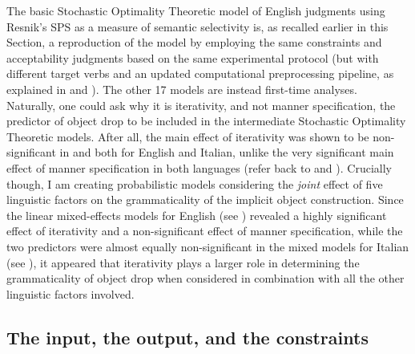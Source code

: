 The basic Stochastic Optimality Theoretic model of English judgments using Resnik's SPS as a measure of semantic selectivity is, as recalled earlier in this Section, a reproduction of the model by \textcite{Medina2007} employing the same constraints and acceptability judgments based on the same experimental protocol (but with different target verbs and an updated computational preprocessing pipeline, as explained in  and ). The other 17 models are instead first-time analyses.\\
Naturally, one could ask why it is iterativity, and not manner specification, the predictor of object drop to be included in the intermediate Stochastic Optimality Theoretic models. After all, the main effect of iterativity was shown to be non-significant in  and  both for English and Italian, unlike the very significant main effect of manner specification in both languages (refer back to  and ). Crucially though, I am creating probabilistic models considering the \textit{joint} effect of five linguistic factors on the grammaticality of the implicit object construction. Since the linear mixed-effects models for English (see ) revealed a highly significant effect of iterativity and a non-significant effect of manner specification, while the two predictors were almost equally non-significant in the mixed models for Italian (see ), it appeared that iterativity plays a larger role in determining the grammaticality of object drop when considered in combination with all the other linguistic factors involved.


\subsection{The input, the output, and the constraints} 


